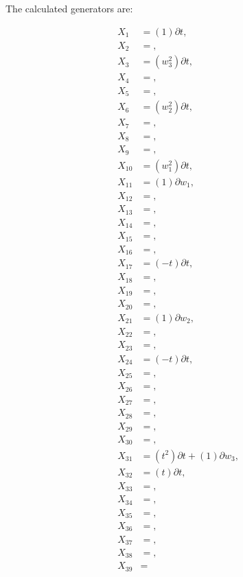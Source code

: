 \noindent The calculated generators are:

\begin{align*}
X_{1}&=\left( 1 \right)\partial t,\\
X_{2}&=,\\
X_{3}&=\left( w_{3}^{2} \right)\partial t,\\
X_{4}&=,\\
X_{5}&=,\\
X_{6}&=\left( w_{2}^{2} \right)\partial t,\\
X_{7}&=,\\
X_{8}&=,\\
X_{9}&=,\\
X_{10}&=\left( w_{1}^{2} \right)\partial t,\\
X_{11}&=\left( 1 \right)\partial w_{1},\\
X_{12}&=,\\
X_{13}&=,\\
X_{14}&=,\\
X_{15}&=,\\
X_{16}&=,\\
X_{17}&=\left( - t \right)\partial t,\\
X_{18}&=,\\
X_{19}&=,\\
X_{20}&=,\\
X_{21}&=\left( 1 \right)\partial w_{2},\\
X_{22}&=,\\
X_{23}&=,\\
X_{24}&=\left( - t \right)\partial t,\\
X_{25}&=,\\
X_{26}&=,\\
X_{27}&=,\\
X_{28}&=,\\
X_{29}&=,\\
X_{30}&=,\\
X_{31}&=\left( t^{2} \right)\partial t+\left( 1 \right)\partial w_{3},\\
X_{32}&=\left( t \right)\partial t,\\
X_{33}&=,\\
X_{34}&=,\\
X_{35}&=,\\
X_{36}&=,\\
X_{37}&=,\\
X_{38}&=,\\
X_{39}&=\end{align*}
